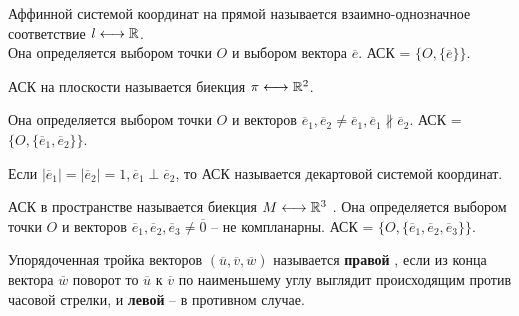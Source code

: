 


	\Header

	\BeginConspect


	

	\begin{Def}
		Аффинной системой координат на прямой называется взаимно-однозначное соответствие $l \longleftrightarrow \mathbb{R}$. \\
		
		Она определяется выбором точки $O$  и выбором вектора $\overline{e}$. АСК = $\{O, \{\overline{e}\}\}$.
	\end{Def}

	\begin{figure}[h]
		\centering
		\def\svgwidth{0.3\columnwidth}
		
	\end{figure}


	\begin{Def}
		АСК на плоскости называется биекция $\pi \longleftrightarrow \mathbb{R}^2$. 

		Она определяется выбором точки $O$ и векторов $\overline{e}_1, \overline{e}_2 \neq \overline{e}_1, \overline{e}_1 \not\parallel \overline{e}_2$. 
		АСК = $\{O, \{\overline{e}_1, \overline{e}_2\}\}$.
	\end{Def}

	\begin{figure}[h]
		\centering
		\def\svgwidth{0.3\columnwidth}
		
	\end{figure}

	\begin{Def}
		Если $|\overline{e}_1| = |\overline{e}_2| = 1, \overline{e}_1 \perp \overline{e}_2$, то АСК называется декартовой системой координат. 
	\end{Def}

	\begin{Def}
		АСК в пространстве называется биекция $M \longleftrightarrow \mathbb{R}^3$ .
		Она определяется выбором точки $O$ и векторов $\overline{e}_1, \overline{e}_2, \overline{e}_3 \neq \overline{0}$ -- не компланарны. АСК = $\{O, \{\overline{e}_1, \overline{e}_2, \overline{e}_3\}\}$.
	\end{Def}

	\begin{Def}
		Упорядоченная тройка векторов $(\overline{u}, \overline{v}, \overline{w})$ называется \textbf{правой} , 
		если из конца вектора $\overline{w}$ поворот то $\overline{u}$ к $\overline{v}$ по наименьшему углу выглядит происходящим против часовой стрелки,
		и \textbf{левой} -- в противном случае. 
	\end{Def}


